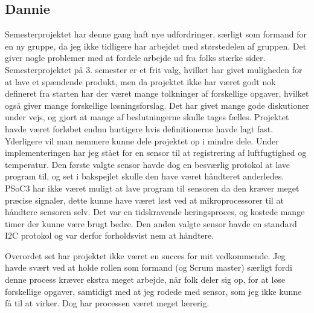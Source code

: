 \subsection{Dannie}

Semesterprojektet har denne gang haft nye udfordringer, særligt som formand for en ny gruppe, da jeg ikke tidligere har arbejdet med størstedelen af gruppen. Det giver nogle problemer med at fordele arbejde ud fra folks stærke sider. 
Semesterprojektet på 3. semester er et frit valg, hvilket har givet muligheden for at lave et spændende produkt, men da projektet ikke har været godt nok defineret fra starten har der været mange tolkninger af forskellige opgaver, hvilket også giver mange forskellige løsningsforslag. Det har givet mange gode diskutioner under vejs, og gjort at mange af beslutningerne skulle tages fælles. Projektet havde været forløbet endnu hurtigere hvis definitionerne havde lagt fast. Yderligere vil man nemmere kunne dele projektet op i mindre dele. 
Under implementeringen  har jeg stået for en sensor til at registrering af luftfugtighed og temperatur. Den første valgte sensor havde dog en besværlig protokol at lave program til, og set i bakspejlet skulle den have været håndteret anderledes. PSoC3 har ikke været muligt at lave program til sensoren da den kræver meget præcise signaler, dette kunne have været løst ved at mikroprocessorer til at håndtere sensoren selv. Det var en tidskravende læringsproces, og kostede mange timer der kunne være brugt bedre. 
Den anden valgte sensor havde en standard I2C protokol og var derfor forholdsvist nem at håndtere. 

Overordet set har projektet ikke været en succes for mit vedkommende. Jeg havde svært ved at holde rollen som formand (og Scrum master) særligt fordi denne process kræver ekstra meget arbejde, når folk deler sig op, for at løse forskellige opgaver, samtidigt med at jeg rodede med sensor, som jeg ikke kunne få til at virker. Dog har processen været meget lærerig. 